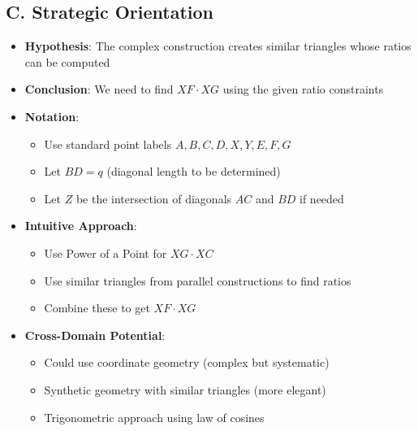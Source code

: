 \documentclass[]{article}
\begin{document}
\begin{problemconfigbox}
\subsection*{C. Strategic Orientation}
\begin{itemize}[leftmargin=*]
    \item \textbf{Hypothesis}: The complex construction creates similar triangles whose ratios can be computed
    \item \textbf{Conclusion}: We need to find $XF \cdot XG$ using the given ratio constraints
    \item \textbf{Notation}:
    \begin{itemize}
        \item Use standard point labels $A, B, C, D, X, Y, E, F, G$
        \item Let $BD = q$ (diagonal length to be determined)
        \item Let $Z$ be the intersection of diagonals $AC$ and $BD$ if needed
    \end{itemize}
    \item \textbf{Intuitive Approach}: 
    \begin{itemize}
        \item Use Power of a Point for $XG \cdot XC$
        \item Use similar triangles from parallel constructions to find ratios
        \item Combine these to get $XF \cdot XG$
    \end{itemize}
    \item \textbf{Cross-Domain Potential}:
    \begin{itemize}
        \item Could use coordinate geometry (complex but systematic)
        \item Synthetic geometry with similar triangles (more elegant)
        \item Trigonometric approach using law of cosines
    \end{itemize}
\end{itemize}
\end{problemconfigbox}
\end{document}
